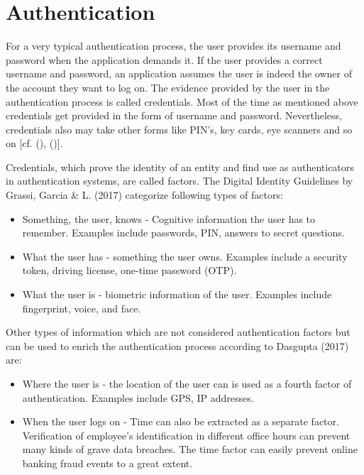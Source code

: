 \section{Authentication}
\label{authentication}
For a very typical authentication process, the user provides its username and password when the application demands it. If the user provides a correct username and password, an application assumes the user is indeed the owner of the account they want to log on. The evidence provided by the user in the authentication process is called credentials. Most of the time as mentioned above credentials get provided in the form of username and password. Nevertheless, credentials also may take other forms like PIN’s, key cards, eye scanners and so on [cf. (\cite{Todorov:2007:MUI}), (\cite{Boyd:2012:GSOAuth})]. 

Credentials, which prove the identity of an entity and find use as authenticators in authentication systems, are called factors. The Digital Identity Guidelines by Grassi, Garcia \& L. (2017) categorize following types of factors:

\begin{itemize}  
	\item Something, the user, knows - Cognitive information the user has to remember. Examples include passwords, PIN, answers to secret questions.
	\item What the user has - something the user owns. Examples include a security token, driving license, one-time password (OTP). 
	\item What the user is - biometric information of the user. Examples include fingerprint, voice, and face. 
\end{itemize}

Other types of information which are not considered authentication factors but  can be used to enrich the authentication process according to Dasgupta (2017) are:

\begin{itemize}
	\item Where the user is - the location of the user can is used as a fourth factor of authentication. Examples include GPS, IP addresses.
	\item When the user logs on - Time can also be extracted as a separate factor. Verification of employee’s identification in different office hours can prevent many kinds of grave data breaches. The time factor can easily prevent online banking fraud events to a great extent. 
\end{itemize}

